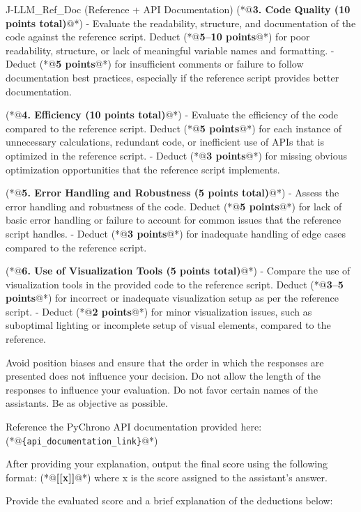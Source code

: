 \begin{PromptBlock}{J-LLM\_Ref\_Doc (Reference + API Documentation)}
(*@\textbf{3. Code Quality (10 points total)}@*)
- Evaluate the readability, structure, and documentation of the code against the reference script. Deduct (*@\textbf{5--10 points}@*) for poor readability, structure, or lack of meaningful variable names and formatting.
- Deduct (*@\textbf{5 points}@*) for insufficient comments or failure to follow documentation best practices, especially if the reference script provides better documentation.

(*@\textbf{4. Efficiency (10 points total)}@*)
- Evaluate the efficiency of the code compared to the reference script. Deduct (*@\textbf{5 points}@*) for each instance of unnecessary calculations, redundant code, or inefficient use of APIs that is optimized in the reference script.
- Deduct (*@\textbf{3 points}@*) for missing obvious optimization opportunities that the reference script implements.

(*@\textbf{5. Error Handling and Robustness (5 points total)}@*)
- Assess the error handling and robustness of the code. Deduct (*@\textbf{5 points}@*) for lack of basic error handling or failure to account for common issues that the reference script handles.
- Deduct (*@\textbf{3 points}@*) for inadequate handling of edge cases compared to the reference script.

(*@\textbf{6. Use of Visualization Tools (5 points total)}@*)
- Compare the use of visualization tools in the provided code to the reference script. Deduct (*@\textbf{3--5 points}@*) for incorrect or inadequate visualization setup as per the reference script.
- Deduct (*@\textbf{2 points}@*) for minor visualization issues, such as suboptimal lighting or incomplete setup of visual elements, compared to the reference.

Avoid position biases and ensure that the order in which the responses are presented does not influence your decision. Do not allow the length of the responses to influence your evaluation. Do not favor certain names of the assistants. Be as objective as possible.

Reference the PyChrono API documentation provided here: (*@\texttt{\{api\_documentation\_link\}}@*)

After providing your explanation, output the final score using the following format: (*@\textbf{[[x]]}@*) where x is the score assigned to the assistant's answer.

Provide the evaluated score and a brief explanation of the deductions below:
\end{PromptBlock}

